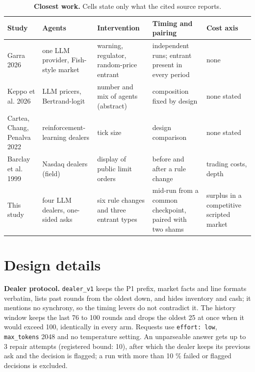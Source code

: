 \documentclass[11pt,a4paper]{article}
\begin{document}
%
\begin{table}[htbp]
\centering
\renewcommand{\thetable}{A1}
\caption{\textbf{Closest work.} Cells state only what the cited source reports.}
\label{tab:A1}
\footnotesize
\setlength{\tabcolsep}{3pt}
%
\begin{tabularx}{\linewidth}{@{}LLLLL@{}}
\toprule
Study & Agents & Intervention & Timing and pairing & Cost axis \\
\midrule
Garra 2026 & one LLM provider, Fish-style market & warning, regulator, random-price entrant & independent runs; entrant present in every period & none \\
Keppo et al. 2026 & LLM pricers, Bertrand-logit & number and mix of agents (abstract) & composition fixed by design & none stated \\
Cartea, Chang, Penalva 2022 & reinforcement-learning dealers & tick size & design comparison & none stated \\
Barclay et al. 1999 & Nasdaq dealers (field) & display of public limit orders & before and after a rule change & trading costs, depth \\
This study & four LLM dealers, one-sided asks & six rule changes and three entrant types & mid-run from a common checkpoint, paired with two shams & surplus in a competitive scripted market \\
\bottomrule
\end{tabularx}
\end{table}

\section{Design details}
\textbf{Dealer protocol.} \texttt{dealer\_\allowbreak{}v1} keeps the \citet{fish2024} P1 prefix, market facts and line formats verbatim, lists past rounds from the oldest down, and hides inventory and cash; it mentions no synchrony, so the timing levers do not contradict it. The history window keeps the last 76 to 100 rounds and drops the oldest 25 at once when it would exceed 100, identically in every arm. Requests use \texttt{effort: low}, \texttt{max\_\allowbreak{}tokens} 2048 and no temperature setting. An unparseable answer gets up to 3 repair attempts (registered bound: 10), after which the dealer keeps its previous ask and the decision is flagged; a run with more than 10 \% failed or flagged decisions is excluded.
\end{document}
